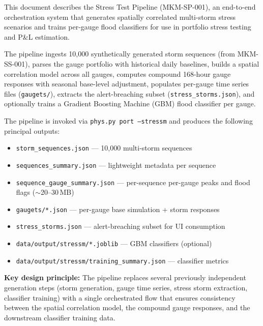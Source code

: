 \documentclass[11pt,a4paper]{article}
\begin{document}
\mkmtitlepage
\mkmlegalpage
\tableofcontents
\clearpage

\mkmexecsummary

This document describes the Stress Test Pipeline (MKM-SP-001), an end-to-end
orchestration system that generates spatially correlated multi-storm stress
scenarios and trains per-gauge flood classifiers for use in portfolio stress
testing and P\&L estimation.

The pipeline ingests 10{,}000 synthetically generated storm sequences (from
MKM-SS-001), parses the gauge portfolio with historical daily baselines,
builds a spatial correlation model across all gauges, computes compound
168-hour gauge responses with seasonal base-level adjustment, populates
per-gauge time series files (\texttt{gaugets/}), extracts the alert-breaching
subset (\texttt{stress\_storms.json}), and optionally trains a Gradient
Boosting Machine (GBM) flood classifier per gauge.

The pipeline is invoked via \texttt{phys.py port --stressm} and produces the
following principal outputs:

\begin{itemize}[nosep]
    \item \texttt{storm\_sequences.json} --- 10{,}000 multi-storm sequences
    \item \texttt{sequences\_summary.json} --- lightweight metadata per sequence
    \item \texttt{sequence\_gauge\_summary.json} --- per-sequence per-gauge
          peaks and flood flags ($\sim$20--30\,MB)
    \item \texttt{gaugets/*.json} --- per-gauge base simulation + storm responses
    \item \texttt{stress\_storms.json} --- alert-breaching subset for UI consumption
    \item \texttt{data/output/stressm/*.joblib} --- GBM classifiers (optional)
    \item \texttt{data/output/stressm/training\_summary.json} --- classifier metrics
\end{itemize}

\textbf{Key design principle:} The pipeline replaces several previously
independent generation steps (storm generation, gauge time series, stress
storm extraction, classifier training) with a single orchestrated flow that
ensures consistency between the spatial correlation model, the compound
gauge responses, and the downstream classifier training data.
\end{document}

